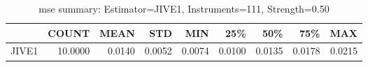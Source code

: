 \begin{table}[ht]
\centering
\caption{mse summary: Estimator=JIVE1, Instruments=111, Strength=0.50}
\begin{tabular}{lrrrrrrrr}
\toprule
 & COUNT & MEAN & STD & MIN & 25\% & 50\% & 75\% & MAX \\
\midrule
JIVE1 & 10.0000 & 0.0140 & 0.0052 & 0.0074 & 0.0100 & 0.0135 & 0.0178 & 0.0215 \\
\bottomrule
\end{tabular}
\end{table}
